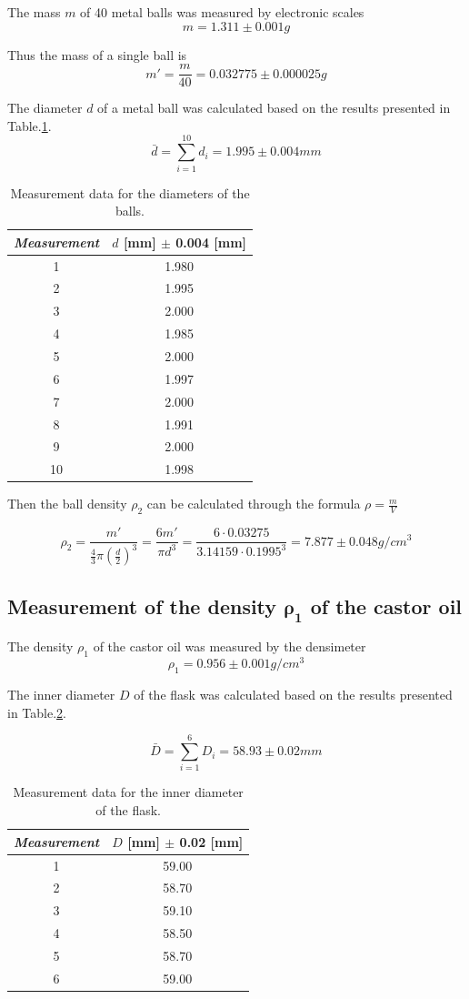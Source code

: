 \documentclass{article}
\begin{document}
The mass $m$ of 40 metal balls was measured by electronic scales
$$m=1.311\pm0.001g$$

Thus the mass of a single ball is
$$m'=\frac{m}{40}=0.032775\pm0.000025g$$

The diameter $d$ of a metal ball was calculated based on the results presented in Table.\ref{diameter}.
$$\bar{d}=\sum_{i=1}^{10}d_i=1.995\pm0.004mm$$

\begin{table}[!h]
\begin{center}
\begin{tabular}{cc}
\hline
\textit{Measurement} & $d$ [mm] $\pm$ 0.004 [mm] \\
\hline
1	&	1.980\\
2	&	1.995\\
3	&	2.000\\
4	&	1.985\\
5	&	2.000\\
6	&	1.997\\
7	&	2.000\\
8	&	1.991\\
9	&	2.000\\
10	&	1.998\\
\hline
\end{tabular}
\caption{Measurement data for the diameters of the balls.}\label{diameter}
\end{center}
\end{table}
Then the ball density $\rho_2$ can be calculated through the formula $\rho=\frac{m}{V}$

$$\rho_2=\frac{m'}{\frac{4}{3}\pi(\frac{d}{2})^3}=\frac{6m'}{\pi d^3}
=\frac{6\cdot0.03275}{3.14159\cdot0.1995^3}=7.877\pm0.048g/cm^3$$ 

\subsection{Measurement of the density $\bm{\rho_1}$ of the castor oil}

The density $\rho_1$ of the castor oil was measured by the densimeter
$$\rho_1=0.956\pm0.001g/cm^3$$

The inner diameter $D$ of the flask was calculated based on the results presented in Table.\ref{Diameter}.

$$\bar{D}=\sum_{i=1}^{6}D_i=58.93\pm0.02mm$$

\begin{table}[!h]
\begin{center}
\begin{tabular}{cc}
\hline
\textit{Measurement} & $D$ [mm] $\pm$ 0.02 [mm] \\
\hline
1	&	59.00\\
2	&	58.70\\
3	&	59.10\\
4	&	58.50\\
5	&	58.70\\
6	&	59.00\\
\hline
\end{tabular}
\caption{Measurement data for the inner diameter of the flask.}\label{Diameter}
\end{center}
\end{table}
\end{document}
